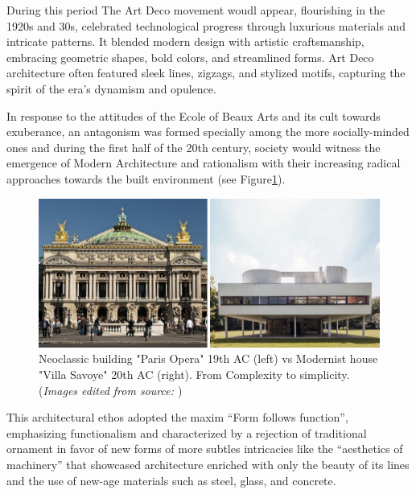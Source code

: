 During this period The Art Deco movement woudl appear, flourishing in the 1920s and 30s, celebrated technological progress through luxurious materials and intricate patterns.
It blended modern design with artistic craftsmanship, embracing geometric shapes, bold colors, and streamlined forms.
Art Deco architecture often featured sleek lines, zigzags, and stylized motifs, capturing the spirit of the era's dynamism and opulence.\cite{Arora2023}

In response to the attitudes of the Ecole of Beaux Arts and its cult towards exuberance, an antagonism was formed specially among the more socially-minded ones and during the first half of the 20th century, society would witness the emergence of Modern Architecture and rationalism with their increasing radical approaches towards the built environment (see Figure\ref{fig:NeoclassicalvsModernism}).

     \begin{figure}[htb]
          \centering
          \includegraphics[width= \linewidth]{Images/NeoclassicismVsModernism}
          \caption{Neoclassic building "Paris Opera" 19th AC (left) vs Modernist house "Villa Savoye" 20th AC (right). From Complexity to simplicity. (\textit{Images edited from source: \cite{Stacbond2020}})}
          \label{fig:NeoclassicalvsModernism}
        \end{figure}

This architectural ethos adopted the maxim ``Form follows function'', emphasizing functionalism and characterized by a rejection of traditional ornament in favor of new forms of more subtles intricacies like the “aesthetics of machinery” that showcased architecture  enriched  with  only  the  beauty of its lines and the use of new-age materials such as steel, glass, and concrete\cite{Gage2015}.



